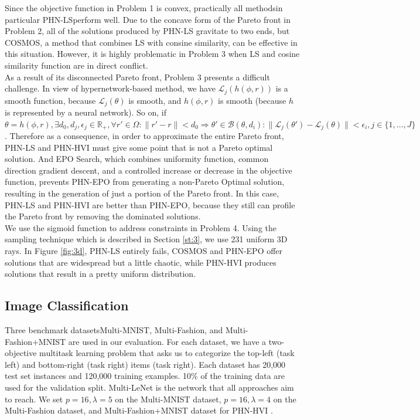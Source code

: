 \documentclass[letterpaper]{article} %
\newcommand{\ourmodel}{PHN-HVI }
\begin{document}
Since the objective function in Problem 1 is convex, practically all methodsin particular PHN-LSperform well. Due to the concave form of the Pareto front in Problem 2, all of the solutions produced by PHN-LS gravitate to two ends, but COSMOS, a method that combines LS with consine similarity, can be effective in this situation. However, it is highly problematic in Problem 3 when LS and cosine similarity function are in direct conflict. \\
As a result of its disconnected Pareto front, Problem 3 presents a difficult challenge. In view of hypernetwork-based method, we have $\mathcal{L}_j(h(\phi, r))$ is a smooth function, because $\mathcal{L}_j(\theta)$ is smooth, and $h(\phi, r)$ is smooth (because $h$ is represented by a neural network). So on, if $\theta = h(\phi, r), \exists d_0, d_j, \epsilon_j \in \mathbb{R}_+, \forall r' \in \Omega: \|r' -r\| < d_0 \Rightarrow \theta' \in \mathcal{B}(\theta, d_i): \|\mathcal{L}_j(\theta') -\mathcal{L}_j(\theta)\| < \epsilon_i, j\in\{1,\dots, J\}$. Therefore as a consequence, in order to approximate the entire Pareto front, PHN-LS and \ourmodel must give some point that is not a Pareto optimal solution. And EPO Search, which combines uniformity function, common direction gradient descent, and a controlled increase or decrease in the objective function, prevents PHN-EPO from generating a non-Pareto Optimal solution, resulting in the generation of just a portion of the Pareto front. In this case, PHN-LS and \ourmodel are better than PHN-EPO, because they still can profile the Pareto front by removing the dominated solutions.\\
\indent We use the sigmoid function to address constraints in Problem 4. Using the sampling technique which is described in Section \ref{st:3}, we use 231 uniform 3D rays. In Figure \ref{fig:3d}, PHN-LS entirely fails, COSMOS and PHN-EPO offer solutions that are widespread but a little chaotic, while \ourmodel produces solutions that result in a pretty uniform distribution. 


\subsection{Image Classification}
Three benchmark datasetsMulti-MNIST, Multi-Fashion, and Multi-Fashion+MNIST \cite{lin2019pareto} are used in our evaluation. For each dataset, we have a two-objective multitask learning problem that asks us to categorize the top-left (task left) and bottom-right (task right) items (task right). Each dataset has 20,000 test set instances and 120,000 training examples. 10\% of the training data are used for the validation split. Multi-LeNet \cite{sener2019multitask} is the network that all approaches aim to reach. We set $p=16, \lambda=5$ on the Multi-MNIST dataset, $p=16, \lambda=4$ on the Multi-Fashion dataset, and Multi-Fashion+MNIST dataset for \ourmodel. 
\end{document}
